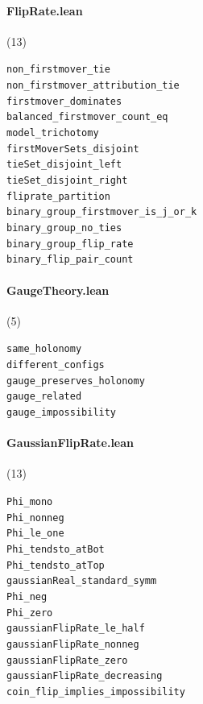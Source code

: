\paragraph{FlipRate.lean} (13)

{\footnotesize
\texttt{non\_firstmover\_tie}\\
\texttt{non\_firstmover\_attribution\_tie}\\
\texttt{firstmover\_dominates}\\
\texttt{balanced\_firstmover\_count\_eq}\\
\texttt{model\_trichotomy}\\
\texttt{firstMoverSets\_disjoint}\\
\texttt{tieSet\_disjoint\_left}\\
\texttt{tieSet\_disjoint\_right}\\
\texttt{fliprate\_partition}\\
\texttt{binary\_group\_firstmover\_is\_j\_or\_k}\\
\texttt{binary\_group\_no\_ties}\\
\texttt{binary\_group\_flip\_rate}\\
\texttt{binary\_flip\_pair\_count}\\
}

\paragraph{GaugeTheory.lean} (5)

{\footnotesize
\texttt{same\_holonomy}\\
\texttt{different\_configs}\\
\texttt{gauge\_preserves\_holonomy}\\
\texttt{gauge\_related}\\
\texttt{gauge\_impossibility}\\
}

\paragraph{GaussianFlipRate.lean} (13)

{\footnotesize
\texttt{Phi\_mono}\\
\texttt{Phi\_nonneg}\\
\texttt{Phi\_le\_one}\\
\texttt{Phi\_tendsto\_atBot}\\
\texttt{Phi\_tendsto\_atTop}\\
\texttt{gaussianReal\_standard\_symm}\\
\texttt{Phi\_neg}\\
\texttt{Phi\_zero}\\
\texttt{gaussianFlipRate\_le\_half}\\
\texttt{gaussianFlipRate\_nonneg}\\
\texttt{gaussianFlipRate\_zero}\\
\texttt{gaussianFlipRate\_decreasing}\\
\texttt{coin\_flip\_implies\_impossibility}\\
}

